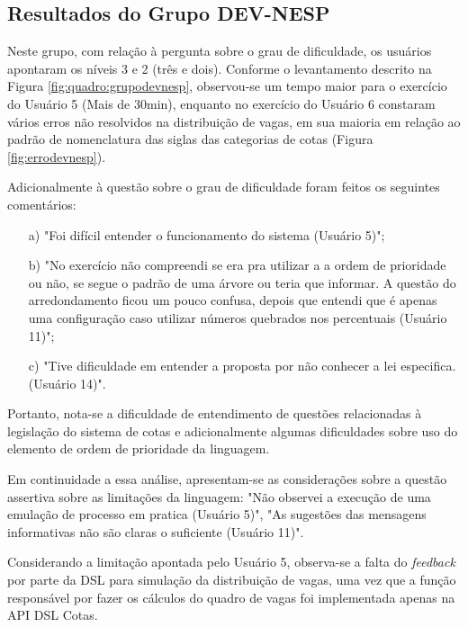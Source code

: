 \newpage
\subsection{Resultados do Grupo DEV-NESP}
\label{subsec:devesp}

Neste grupo, com relação à pergunta sobre o grau de dificuldade, os usuários apontaram os níveis 3 e 2 (três e dois).  Conforme o levantamento descrito na Figura \ref{fig:quadro:grupodevnesp},  observou-se um tempo maior para o exercício do Usuário 5 (Mais de 30min), enquanto no exercício do Usuário 6 constaram vários erros não resolvidos na distribuição de vagas, em sua maioria em relação ao padrão de nomenclatura das siglas das categorias de cotas (Figura \ref{fig:errodevnesp}). 







Adicionalmente à questão sobre o grau de dificuldade foram feitos os seguintes comentários:

\begin{enumerate}
    \item [a)] "Foi difícil entender o funcionamento do sistema (Usuário 5)";
    \item [b)] "No exercício não compreendi se era pra utilizar a a ordem de prioridade ou não, se segue o padrão de uma árvore ou teria que informar. A questão do arredondamento ficou um pouco confusa, depois que entendi que é apenas uma configuração caso utilizar números quebrados nos percentuais (Usuário 11)";
    \item [c)] "Tive dificuldade em entender a proposta por não conhecer a lei especifica.  (Usuário 14)".    
\end{enumerate}

Portanto, nota-se a dificuldade de entendimento de questões relacionadas à legislação do sistema de cotas e adicionalmente algumas dificuldades sobre uso do elemento de ordem de prioridade da linguagem. 

Em continuidade a essa análise, apresentam-se as considerações sobre a questão assertiva sobre as limitações da linguagem: "Não observei a execução de uma emulação de processo em pratica (Usuário 5)", "As sugestões das mensagens informativas não são claras o suficiente (Usuário 11)".

Considerando a limitação apontada pelo Usuário 5, observa-se a falta do \textit{feedback} por parte da DSL para simulação da distribuição de vagas, uma vez que a função responsável por fazer os cálculos do quadro de vagas foi implementada apenas na API DSL Cotas. 


